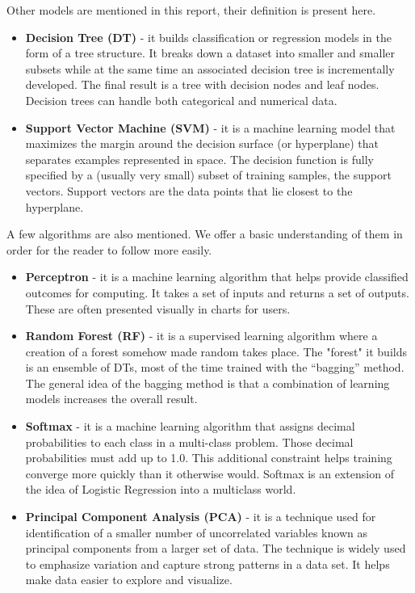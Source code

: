 \documentclass[10pt]{IEEEtran}
\begin{document}
Other models are mentioned in this report, their definition is present here.

\begin{itemize}
\item \textbf{Decision Tree (DT)} - it builds classification or regression models in the form of a tree structure. It breaks down a dataset into smaller and smaller subsets while at the same time an associated decision tree is incrementally developed. The final result is a tree with decision nodes and leaf nodes. Decision trees can handle both categorical and numerical data. 
\item \textbf{Support Vector Machine (SVM)} - it is a machine learning model that maximizes the margin around the decision surface (or hyperplane) that separates examples represented in space. The decision function is fully specified by a (usually very small) subset of training samples, the support vectors. Support vectors are the data points that lie closest to the hyperplane.
\end{itemize}

A few algorithms are also mentioned. We offer a basic understanding of them in order for the reader to follow more easily.

\begin{itemize}
\item \textbf{Perceptron} - it is a machine learning algorithm that helps provide classified outcomes for computing. It takes a set of inputs and returns a set of outputs. These are often presented visually in charts for users.
\item \textbf{Random Forest (RF)} - it is a supervised learning algorithm where a creation of a forest somehow made random takes place. The "forest" it builds is an ensemble of DTs, most of the time trained with the “bagging” method. The general idea of the bagging method is that a combination of learning models increases the overall result.
\item \textbf{Softmax} - it is a machine learning algorithm that assigns decimal probabilities to each class in a multi-class problem. Those decimal probabilities must add up to 1.0. This additional constraint helps training converge more quickly than it otherwise would. Softmax is an extension of the idea of Logistic Regression into a multiclass world.
\item \textbf{Principal Component Analysis (PCA)} - it is a technique used for identification of a smaller number of uncorrelated variables known as principal components from a larger set of data. The technique is widely used to emphasize variation and capture strong patterns in a data set. It helps make data easier to explore and visualize.
\end{itemize}
\end{document}
